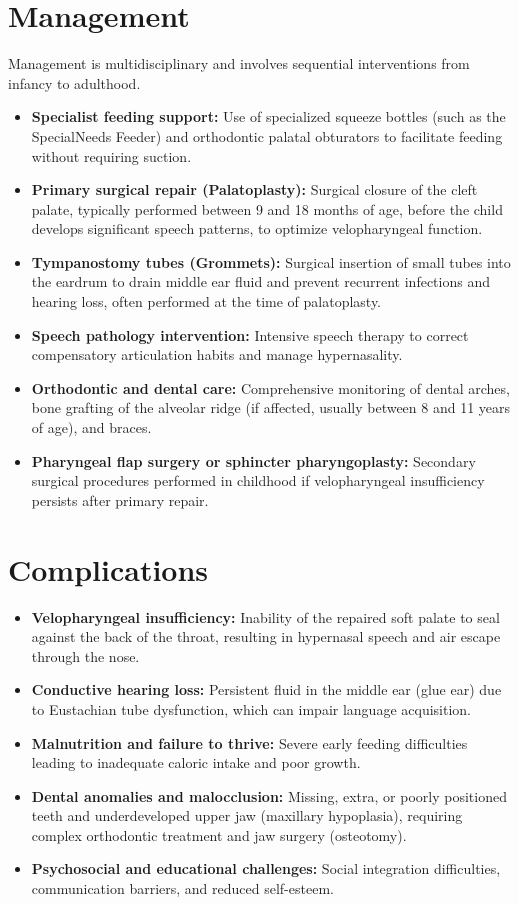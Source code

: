 \section*{Management}
Management is multidisciplinary and involves sequential interventions from infancy to adulthood.
\begin{itemize}
    \item \textbf{Specialist feeding support:} Use of specialized squeeze bottles (such as the SpecialNeeds Feeder) and orthodontic palatal obturators to facilitate feeding without requiring suction.
    \item \textbf{Primary surgical repair (Palatoplasty):} Surgical closure of the cleft palate, typically performed between 9 and 18 months of age, before the child develops significant speech patterns, to optimize velopharyngeal function.
    \item \textbf{Tympanostomy tubes (Grommets):} Surgical insertion of small tubes into the eardrum to drain middle ear fluid and prevent recurrent infections and hearing loss, often performed at the time of palatoplasty.
    \item \textbf{Speech pathology intervention:} Intensive speech therapy to correct compensatory articulation habits and manage hypernasality.
    \item \textbf{Orthodontic and dental care:} Comprehensive monitoring of dental arches, bone grafting of the alveolar ridge (if affected, usually between 8 and 11 years of age), and braces.
    \item \textbf{Pharyngeal flap surgery or sphincter pharyngoplasty:} Secondary surgical procedures performed in childhood if velopharyngeal insufficiency persists after primary repair.
\end{itemize}

\section*{Complications}
\begin{itemize}
    \item \textbf{Velopharyngeal insufficiency:} Inability of the repaired soft palate to seal against the back of the throat, resulting in hypernasal speech and air escape through the nose.
    \item \textbf{Conductive hearing loss:} Persistent fluid in the middle ear (glue ear) due to Eustachian tube dysfunction, which can impair language acquisition.
    \item \textbf{Malnutrition and failure to thrive:} Severe early feeding difficulties leading to inadequate caloric intake and poor growth.
    \item \textbf{Dental anomalies and malocclusion:} Missing, extra, or poorly positioned teeth and underdeveloped upper jaw (maxillary hypoplasia), requiring complex orthodontic treatment and jaw surgery (osteotomy).
    \item \textbf{Psychosocial and educational challenges:} Social integration difficulties, communication barriers, and reduced self-esteem.
\end{itemize}

